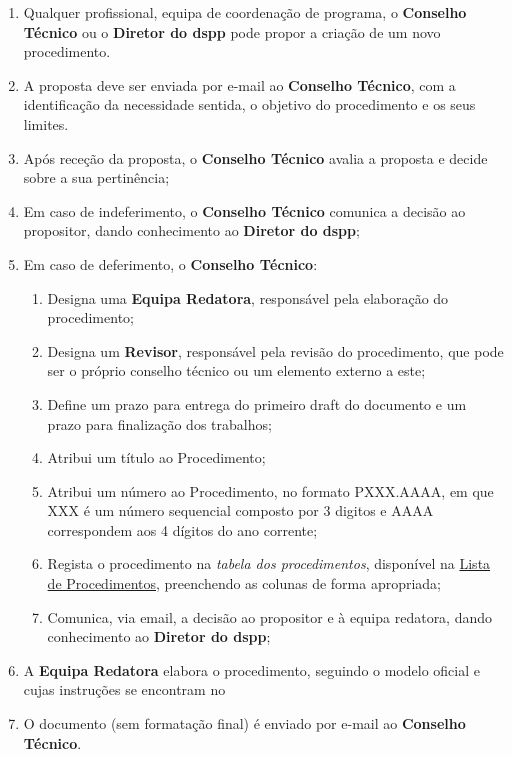\begin{enumerate}
  \item Qualquer profissional, equipa de coordenação de programa, o \textbf{Conselho Técnico} ou o \textbf{Diretor do \gls{dspp}} pode propor a criação de um novo procedimento.
  \item A proposta deve ser enviada por e-mail ao \textbf{Conselho Técnico}, com a identificação da necessidade sentida, o objetivo do procedimento e os seus limites.
  \item Após receção da proposta, o \textbf{Conselho Técnico} avalia a proposta e decide sobre a sua pertinência;
  \item Em caso de indeferimento, o \textbf{Conselho Técnico} comunica a decisão ao propositor, dando conhecimento ao \textbf{Diretor do \gls{dspp}};
  \item Em caso de deferimento, o \textbf{Conselho Técnico}:
  \begin{enumerate}
    \item Designa uma \textbf{Equipa Redatora}, responsável pela elaboração do procedimento;
    \item Designa um \textbf{Revisor}, responsável pela revisão do procedimento, que pode ser o próprio conselho técnico ou um elemento externo a este;
    \item Define um prazo para entrega do primeiro draft do documento e um prazo para finalização dos trabalhos;
    \item Atribui um título ao Procedimento;
    \item Atribui um número ao Procedimento, no formato PXXX.AAAA, em que XXX é um número sequencial composto por 3 digitos e AAAA correspondem aos 4 dígitos do ano corrente;
    \item Regista o procedimento na \textit{tabela dos procedimentos}, disponível na \href{https://snspt-my.sharepoint.com/:l:/r/personal/93839_ulso_min-saude_pt/Lists/Lista%20de%20Procedimentos?e=zkbTNC}{Lista de Procedimentos}, preenchendo as colunas de forma apropriada;
    \item Comunica, via email, a decisão ao propositor e à equipa redatora, dando conhecimento ao \textbf{Diretor do \gls{dspp}};
  \end{enumerate}
  \item A \textbf{Equipa Redatora} elabora o procedimento, seguindo o modelo oficial e cujas instruções se encontram no 
  \item O documento (sem formatação final) é enviado por e-mail ao \textbf{Conselho Técnico}.

\end{enumerate}
